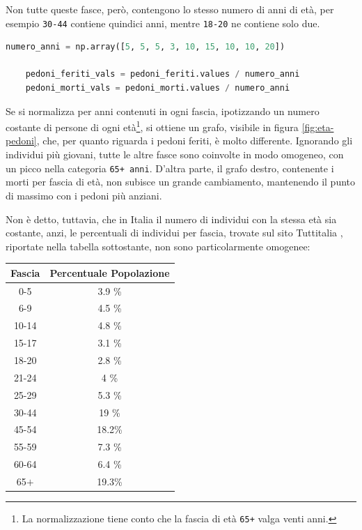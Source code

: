 \documentclass[a4paper,12pt]{report}
\newcommand{\columnstyle}[1]{\texttt{#1}}
\begin{document}
Non tutte queste fasce, però, contengono lo stesso numero di anni di età, 
per esempio \columnstyle{30-44} contiene quindici anni, mentre 
\columnstyle{18-20} ne contiene solo due.

\begin{lstlisting}[language=Python]
    numero_anni = np.array([5, 5, 5, 3, 10, 15, 10, 10, 20])

    pedoni_feriti_vals = pedoni_feriti.values / numero_anni
    pedoni_morti_vals = pedoni_morti.values / numero_anni
\end{lstlisting}

Se si normalizza per anni contenuti in ogni fascia, ipotizzando un numero 
costante di persone di ogni età\footnote{La normalizzazione tiene conto 
che la fascia di età \columnstyle{65+} valga venti anni.}, 
si ottiene un grafo, visibile in figura \ref{fig:eta-pedoni}, che, per 
quanto riguarda i pedoni feriti, è molto differente.
Ignorando gli individui più giovani, tutte le altre fasce sono coinvolte 
in modo omogeneo, con un picco nella categoria \columnstyle{65+ anni}.
D'altra parte, il grafo destro, contenente i morti per fascia di età, 
non subisce un grande cambiamento, mantenendo il punto di massimo con 
i pedoni più anziani.

Non è detto, tuttavia, che in Italia il numero di individui con 
la stessa età sia costante, anzi, le percentuali di individui per fascia, 
trovate sul sito Tuttitalia \cite{TUTTITALIA:1}, riportate nella tabella 
sottostante, non sono particolarmente omogenee: 

\begin{center}
    \def\arraystretch{1.5}%
    \begin{tabular}{ |c|c| } 
    \hline
    Fascia & Percentuale Popolazione \\ 
    \hline
    \rowcolor{TableGray}
    0-5     & 3.9 \% \\ 
    6-9     & 4.5 \% \\
    \rowcolor{TableGray}
    10-14   & 4.8 \% \\
    15-17   & 3.1 \% \\
    \rowcolor{TableGray}
    18-20   & 2.8 \% \\ 
    21-24   & 4   \% \\
    \rowcolor{TableGray}
    25-29   & 5.3 \% \\
    30-44   & 19  \% \\
    \rowcolor{TableGray}
    45-54   & 18.2\% \\ 
    55-59   & 7.3 \% \\
    \rowcolor{TableGray}
    60-64   & 6.4 \% \\
    65$+$   & 19.3\% \\
    \hline
    \end{tabular}
\end{center}
\end{document}
